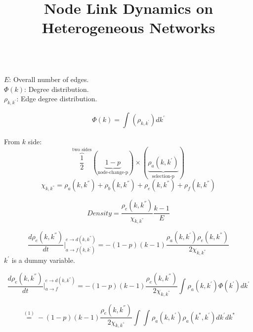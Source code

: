\documentclass[11pt,a4paper]{article}
\title{\textbf{Node Link Dynamics on Heterogeneous Networks}}
\date{}
\begin{document}
\maketitle


~\\
$E$: Overall number of edges.\\
$\Phi(k)$: Degree distribution.\\
$\rho_{k,k^{'}}$: Edge degree distribution.

\begin{equation}
\Phi(k) = \int_{}^{ }( \rho_{k,k^{'}} ) dk^{'}
\end{equation}

From $k$ side:
\begin{equation}
\overbrace{\frac{1}{2}}^\text{two sides}
(\underbrace{1-p}_\textrm{node-change-p}) \times (\underbrace{\rho_a(k,k^{'})}_\textrm{selection-p} )
\end{equation}
\begin{equation}
\chi_{k, k^{''}} = { \rho_{a}(k,k^{''}) + \rho_{b}(k,k^{''}) + \rho_{e}(k,k^{''}) + \rho_{f}(k,k^{''})}
\end{equation}

\begin{equation}
Density = \frac{ \rho_{e}(k,k^{''}) }
{ \chi_{k, k^{''}}}
\frac{k-1}{E}
\end{equation}

\begin{equation}
\frac{d\rho_e(k,k^{''})}
{dt}
|{}_
{a\rightarrow f(k,k^{'})}^{e\rightarrow d(k,k^{''})}
= -(1-p)(k-1)
\frac
{\rho_a(k,k^{'})\rho_{e}(k,k^{''})}
{2\chi_{k, k^{''}}}
\end{equation}
$k^{'}$ is a dummy variable.

\begin{equation}
\frac{d\rho_e(k,k^{''})}
{dt}
|{}_
{a\rightarrow f}^{e\rightarrow d(k,k^{''})}
= -(1-p)(k-1)
\frac
{\rho_{e}(k,k^{''})}
{2\chi_{k, k^{''}}}
\int_{}^{ }
{\rho_a(k,k^{'})\Phi(k^{'})}
dk^{'}
\end{equation}

\begin{equation}
 \overset{(1)}{=}
-(1-p)(k-1)
\frac
{\rho_{e}(k,k^{''})}
{2\chi_{k, k^{''}}}
\int_{}^{ }
\int_{}^{ }
\rho_a(k,k^{'})
\rho_a(k^{*},k^{'})
dk^{'}
dk^{*}
\end{equation}
\end{document}

